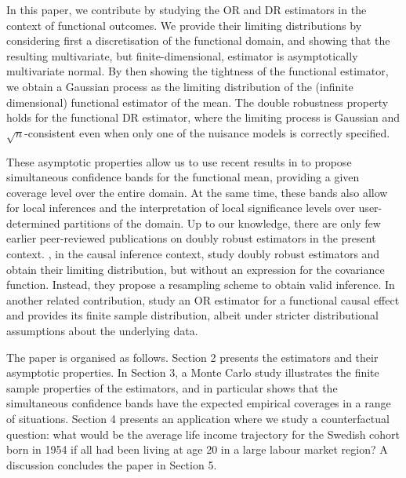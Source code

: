 \documentclass[12pt, A4]{article}
\begin{document}
        In this paper, we contribute by studying the OR and DR estimators in the context of functional outcomes. 
        We provide their limiting distributions by considering first a discretisation of the functional domain, and showing that the resulting multivariate, but finite-dimensional, estimator is asymptotically multivariate normal. 
        By then showing the tightness of the functional estimator, we obtain a Gaussian process as the limiting distribution of the (infinite dimensional) functional estimator of the mean. 
        The double robustness property holds for the functional DR estimator, where the limiting process is Gaussian and $\sqrt{n}$-consistent even when only one of the nuisance models is correctly specified. 
        
        These asymptotic properties allow us to use recent results in \cite{Liebl} to propose simultaneous confidence bands for the functional mean, providing a given coverage level over the entire domain. 
        At the same time, these bands also allow for local inferences and the interpretation of local significance levels over user-determined partitions of the domain. 
        Up to our knowledge, there are only few earlier peer-reviewed publications on doubly robust estimators in the present context. 
        \cite{Belloni}, in the causal inference context, study doubly robust estimators and obtain their limiting distribution, but without an expression for the covariance function. 
        Instead, they propose a resampling scheme to obtain valid inference. 
        In another related contribution, \cite{ecker2023causal} study an OR estimator for a functional causal effect and provides its finite sample distribution, albeit under stricter distributional assumptions about the underlying data. 
        
        The paper is organised as follows. 
        Section 2 presents the estimators and their asymptotic properties. 
        In Section 3, a Monte Carlo study illustrates the finite sample properties of the estimators, and in particular shows that the simultaneous confidence bands have the expected empirical coverages in a range of situations. 
        Section 4 presents an application where we study a counterfactual question: what would be the average life income trajectory for the Swedish cohort born in 1954 if all had been living at age 20 in a large labour market region? A discussion concludes the paper in Section 5.

\end{document}
